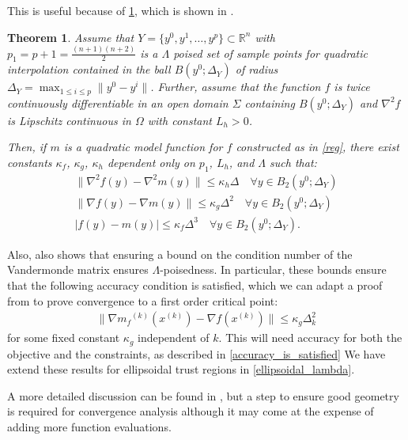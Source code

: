 \documentclass{article}
\newtheorem{theorem}{Theorem}[section]
\theoremstyle{case}
\numberwithin{theorem}{subsection}
\newcommand{\dk}{\Delta_k}
\newcommand{\gradf}{\nabla f}
\newcommand{\mfk}{{{m}_f}^{(k)}}
\newcommand{\Rn}{\mathbb R^n}
\newcommand{\xk}{{x^{(k)}}}
\begin{document}
This is useful because of \cref{quadratic_errors}, which is shown in \cite{DUMMY:intro_book}.

\begin{theorem}
\label{quadratic_errors}
Assume that $Y = \{y^0, y^1, \ldots, y^p\} \subset \Rn$ with $p_1 = p+1= \frac{(n+1)(n+2)}{2}$ is a $\Lambda$
poised set of sample points for quadratic interpolation contained in the ball $B(y^0; \Delta_Y)$ of radius $\Delta_Y = \max_{1\le i \le p} \|y^0 - y^i\|$.
Further, assume that the function $f$ is twice continuously differentiable in an open domain $\Sigma$ containing $B(y^0; \Delta_Y)$ and $\nabla^2 f$
is Lipschitz continuous in $\Omega$ with constant $L_h > 0$.

Then, if $m$ is a quadratic model function for $f$ constructed as in \cref{reg}, there exist constants $\kappa_f$, $\kappa_g$, $\kappa_h$ dependent only on $p_1$, $L_h$, and $\Lambda$ such that:
\begin{align}
\|\nabla^2 f(y) - \nabla^2 m(y)\| \le \kappa_{h} \Delta \quad \forall y \in B_2(y^0; \Delta_Y) \label{error_in_hessian}\\
\|\gradf(y) - \nabla m(y)\| \le \kappa_{g} \Delta^2 \quad \forall y \in B_2(y^0; \Delta_Y) \label{error_in_gradient} \\
|f(y) - m(y) | \le \kappa_{f} \Delta^3 \quad \forall y \in B_2(y^0; \Delta_Y). \label{error_in_function} 
\end{align}
\end{theorem}


Also, \cite{DUMMY:intro_book} also shows that ensuring a bound on the condition number of the Vandermonde matrix ensures $\Lambda$-poisedness.
In particular, these bounds ensure that the following accuracy condition is satisfied, which we can adapt a proof from \cite{Conejo:2013:GCT:2620806.2621814} to prove convergence to a first order critical point: 
\begin{align}
\label{accuracy}
\|\nabla \mfk(\xk) - \gradf(\xk) \| \le \kappa_g \dk^2
\end{align}
for some fixed constant $\kappa_g$ independent of $k$.
This will need accuracy for both the objective and the constraints, as described in \cref{accuracy_is_satisfied}
We have extend these results for ellipsoidal trust regions in \cref{ellipsoidal_lambda}.
 
A more detailed discussion can be found in \cite{doi:10.1080/10556780802409296}, but a step to ensure good geometry is required for convergence analysis although it may come at the expense of adding more function evaluations.
\end{document}
